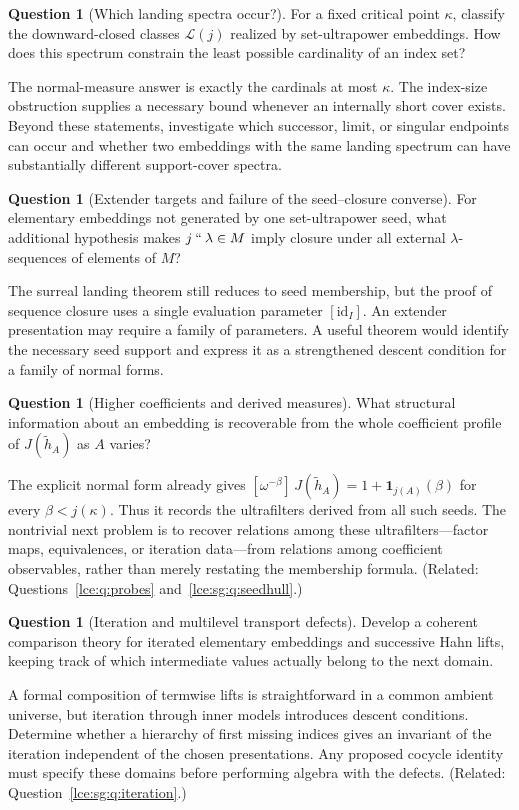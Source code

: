 \documentclass[11pt,letterpaper]{article}
\numberwithin{equation}{section}
\theoremstyle{definition}
\newtheorem{question}[theorem]{Question}
\theoremstyle{remark}
\newcommand{\imset}[2]{#1\mathbin{``}#2}
\newcommand{\coef}[2]{[\omega^{#1}]\,#2}
\begin{document}
\begin{question}[Which landing spectra occur?]\label{lce:cs:q:spectra}
For a fixed critical point $\kappa$, classify the downward-closed classes
$\mathcal L(j)$ realized by set-ultrapower embeddings. How does this
spectrum constrain the least possible cardinality of an index set?
\end{question}
The normal-measure answer is exactly the cardinals at most $\kappa$. The
index-size obstruction supplies a necessary bound whenever an internally
short cover exists. Beyond these statements, investigate which successor,
limit, or singular endpoints can occur and whether two embeddings with the
same landing spectrum can have substantially different support-cover
spectra.

\begin{question}[Extender targets and failure of the seed--closure converse]
\label{lce:cs:q:extender}
For elementary embeddings not generated by one set-ultrapower seed, what
additional hypothesis makes $\imset j\lambda\in M$ imply closure under all
external $\lambda$-sequences of elements of $M$?
\end{question}
The surreal landing theorem still reduces to seed membership, but the proof
of sequence closure uses a single evaluation parameter $[\mathrm{id}_I]$. An
extender presentation may require a family of parameters. A useful theorem
would identify the necessary seed support and express it as a strengthened
descent condition for a family of normal forms.

\begin{question}[Higher coefficients and derived measures]\label{lce:cs:q:higher}
What structural information about an embedding is recoverable from the
whole coefficient profile of $J(\tilde h_A)$ as $A$ varies?
\end{question}
The explicit normal form already gives
$\coef{-\beta}{J(\tilde h_A)}=1+\mathbf 1_{j(A)}(\beta)$ for every
$\beta<j(\kappa)$. Thus it records the ultrafilters derived from all such
seeds. The nontrivial next problem is to recover relations among these
ultrafilters---factor maps, equivalences, or iteration data---from relations
among coefficient observables, rather than merely restating the membership
formula. (Related: Questions~\ref{lce:q:probes} and~\ref{lce:sg:q:seedhull}.)

\begin{question}[Iteration and multilevel transport defects]\label{lce:cs:q:iteration}
Develop a coherent comparison theory for iterated elementary embeddings and
successive Hahn lifts, keeping track of which intermediate values actually
belong to the next domain.
\end{question}
A formal composition of termwise lifts is straightforward in a common
ambient universe, but iteration through inner models introduces descent
conditions. Determine whether a hierarchy of first missing indices gives an
invariant of the iteration independent of the chosen presentations. Any
proposed cocycle identity must specify these domains before performing
algebra with the defects. (Related: Question~\ref{lce:sg:q:iteration}.)
\end{document}
